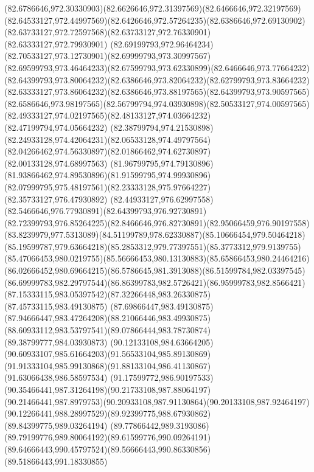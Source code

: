 {{  \curveto(82.6786646,972.30330903)(82.6626646,972.31397569)(82.6466646,972.32197569)
  \curveto(82.64533127,972.44997569)(82.6426646,972.57264235)(82.6386646,972.69130902)
  \curveto(82.63733127,972.72597568)(82.63733127,972.76330901)(82.63333127,972.79930901)
  \curveto(82.69199793,972.96464234)(82.70533127,973.12730901)(82.69999793,973.30997567)
  \curveto(82.69599793,973.46464233)(82.67599793,973.62330899)(82.6466646,973.77664232)
  \curveto(82.64399793,973.80064232)(82.6386646,973.82064232)(82.62799793,973.83664232)
  \curveto(82.63333127,973.86064232)(82.6386646,973.88197565)(82.64399793,973.90597565)
  \curveto(82.6586646,973.98197565)(82.56799794,974.03930898)(82.50533127,974.00597565)
  \curveto(82.49333127,974.02197565)(82.48133127,974.03664232)(82.47199794,974.05664232)
  \curveto(82.38799794,974.21530898)(82.24933128,974.42064231)(82.06533128,974.49797564)
  \curveto(82.04266462,974.56330897)(82.01866462,974.62730897)(82.00133128,974.68997563)
  \curveto(81.96799795,974.79130896)(81.93866462,974.89530896)(81.91599795,974.99930896)
  \curveto(82.07999795,975.48197561)(82.23333128,975.97664227)(82.35733127,976.47930892)
  \curveto(82.44933127,976.62997558)(82.5466646,976.77930891)(82.64399793,976.92730891)
  \curveto(82.72399793,976.85264225)(82.8466646,976.82730891)(82.95066459,976.90197558)
  \curveto(83.8239979,977.5313089)(84.51199789,978.62330887)(85.10666454,979.50464218)
  \curveto(85.19599787,979.63664218)(85.2853312,979.77397551)(85.3773312,979.9139755)
  \curveto(85.47066453,980.0219755)(85.56666453,980.13130883)(85.65866453,980.24464216)
  \curveto(86.02666452,980.69664215)(86.5786645,981.3913088)(86.51599784,982.03397545)
  \curveto(86.69999783,982.29797544)(86.86399783,982.5726421)(86.95999783,982.8566421)
  \curveto(87.15333115,983.05397542)(87.32266448,983.26330875)(87.45733115,983.49130875)
  \curveto(87.69866447,983.49130875)(87.94666447,983.47264208)(88.21066446,983.49930875)
  \curveto(88.60933112,983.53797541)(89.07866444,983.78730874)(89.38799777,984.03930873)
  \curveto(90.12133108,984.63664205)(90.60933107,985.61664203)(91.56533104,985.89130869)
  \curveto(91.91333104,985.99130868)(91.88133104,986.41130867)(91.63066438,986.58597534)
  \curveto(91.17599772,986.90197533)(90.35466441,987.31264198)(90.21733108,987.88064197)
  \curveto(90.21466441,987.8979753)(90.20933108,987.91130864)(90.20133108,987.92464197)
  \curveto(90.12266441,988.28997529)(89.92399775,988.67930862)(89.84399775,989.03264194)
  \curveto(89.77866442,989.3193086)(89.79199776,989.80064192)(89.61599776,990.09264191)
  \curveto(89.64666443,990.45797524)(89.56666443,990.86330856)(89.51866443,991.18330855)
}}
